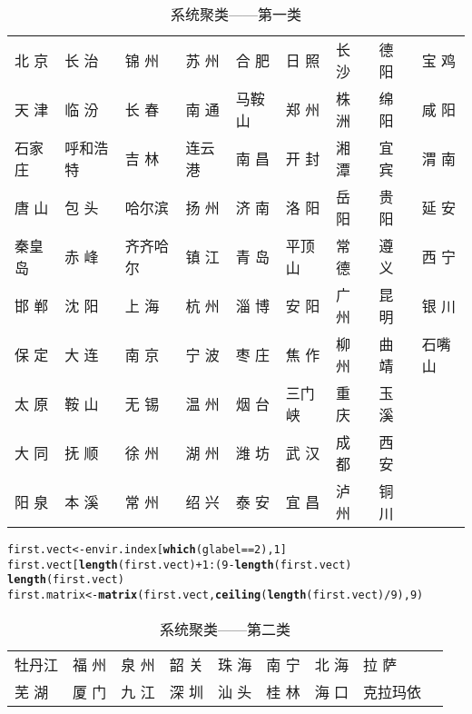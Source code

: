 \documentclass[12pt,oneside]{report}\usepackage{graphicx, color}
\makeatletter
\newcommand{\hlfunctioncall}[1]{\textcolor[rgb]{0.501960784313725,0,0.329411764705882}{\textbf{#1}}}%
\newenvironment{kframe}{%
 \def\at@end@of@kframe{}%
 \ifinner\ifhmode%
  \def\at@end@of@kframe{\end{minipage}}%
  \begin{minipage}{\columnwidth}%
 \fi\fi%
 \def\FrameCommand##1{\hskip\@totalleftmargin \hskip-\fboxsep
 \colorbox{shadecolor}{##1}\hskip-\fboxsep
     \hskip-\linewidth \hskip-\@totalleftmargin \hskip\columnwidth}%
 \MakeFramed {\advance\hsize-\width
   \@totalleftmargin\z@ \linewidth\hsize
   \@setminipage}}%
 {\par\unskip\endMakeFramed%
 \at@end@of@kframe}
\newenvironment{knitrout}{}{} %
\makeatother
\begin{document}
\begin{table}[ht]
\begin{center}
\begin{tabular}{lllllllll}
  \hline
  \hline
北 京 & 长 治 & 锦 州 & 苏 州 & 合 肥 & 日 照 & 长 沙 & 德 阳 & 宝 鸡 \\ 
  天 津 & 临 汾 & 长 春 & 南 通 & 马鞍山 & 郑 州 & 株 洲 & 绵 阳 & 咸 阳 \\ 
  石家庄 & 呼和浩特 & 吉 林 & 连云港 & 南 昌 & 开 封 & 湘 潭 & 宜 宾 & 渭 南 \\ 
  唐 山 & 包 头 & 哈尔滨 & 扬 州 & 济 南 & 洛 阳 & 岳 阳 & 贵 阳 & 延 安 \\ 
  秦皇岛 & 赤 峰 & 齐齐哈尔 & 镇 江 & 青 岛 & 平顶山 & 常 德 & 遵 义 & 西 宁 \\ 
  邯 郸 & 沈 阳 & 上 海 & 杭 州 & 淄 博 & 安 阳 & 广 州 & 昆 明 & 银 川 \\ 
  保 定 & 大 连 & 南 京 & 宁 波 & 枣 庄 & 焦 作 & 柳 州 & 曲 靖 & 石嘴山 \\ 
  太 原 & 鞍 山 & 无 锡 & 温 州 & 烟 台 & 三门峡 & 重 庆 & 玉 溪 &  \\ 
  大 同 & 抚 顺 & 徐 州 & 湖 州 & 潍 坊 & 武 汉 & 成 都 & 西 安 &  \\ 
  阳 泉 & 本 溪 & 常 州 & 绍 兴 & 泰 安 & 宜 昌 & 泸 州 & 铜 川 &  \\ 
   \hline
\end{tabular}
\caption{系统聚类——第一类}
\end{center}
\end{table}

          
\begin{knitrout}
\color{fgcolor}\begin{kframe}
\begin{alltt}
first.vect <- envir.index[\hlfunctioncall{which}(glabel == 2), 1]
first.vect[\hlfunctioncall{length}(first.vect) + 1:(9 - \hlfunctioncall{length}(first.vect)%%9)] <- \hlfunctioncall{rep}(NA, 9 - 
    \hlfunctioncall{length}(first.vect)%%9)
first.matrix <- \hlfunctioncall{matrix}(first.vect, \hlfunctioncall{ceiling}(\hlfunctioncall{length}(first.vect)/9), 9)
\end{alltt}
\end{kframe}
\end{knitrout}

\begin{table}[ht]
\begin{center}
\begin{tabular}{lllllllll}
  \hline
  \hline
牡丹江 & 福 州 & 泉 州 & 韶 关 & 珠 海 & 南 宁 & 北 海 & 拉 萨 &  \\ 
  芜 湖 & 厦 门 & 九 江 & 深 圳 & 汕 头 & 桂 林 & 海 口 & 克拉玛依 &  \\ 
   \hline
\end{tabular}
\caption{系统聚类——第二类}
\end{center}
\end{table}
\end{document}
